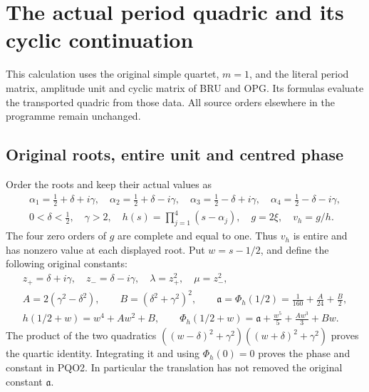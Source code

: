 \documentclass[11pt,a4paper]{article}
\begin{document}


\section{The actual period quadric and its cyclic continuation}
\label{sec:PQO}

This calculation uses the original simple quartet, $m=1$, and the
literal period matrix, amplitude unit and cyclic matrix of BRU and
OPG. Its formulas evaluate the transported quadric from those data.
All source orders elsewhere in the programme remain unchanged.

\subsection{Original roots, entire unit and centred phase}
Order the roots and keep their actual values as
\[
\begin{gathered}
 \alpha_1=\tfrac12+\delta+i\gamma,\quad
 \alpha_2=\tfrac12+\delta-i\gamma,\quad
 \alpha_3=\tfrac12-\delta+i\gamma,\quad
 \alpha_4=\tfrac12-\delta-i\gamma,\\
 0<\delta<\tfrac12,\quad\gamma>2,\quad
 h(s)=\prod_{j=1}^4(s-\alpha_j),\quad g=2\xi,\quad v_h=g/h.
\end{gathered}\tag{PQO1}
\]
The four zero orders of $g$ are complete and equal to one.
Thus $v_h$ is entire and has nonzero value at each displayed root.
Put $w=s-1/2$, and define the following original constants:
\[
\begin{gathered}
 z_+=\delta+i\gamma,\quad z_-=\delta-i\gamma,\quad
 \lambda=z_+^2,\quad\mu=z_-^2,\\
 A=2(\gamma^2-\delta^2),\qquad B=(\delta^2+\gamma^2)^2,\qquad
 \mathfrak a=\Phi_h(1/2)=\frac1{160}+\frac A{24}+\frac B2,\\
 h(1/2+w)=w^4+Aw^2+B,\qquad
 \Phi_h(1/2+w)=\mathfrak a+\frac{w^5}{5}+\frac{Aw^3}{3}+Bw.
\end{gathered}\tag{PQO2}
\]
The product of the two quadratics
$((w-\delta)^2+\gamma^2)((w+\delta)^2+\gamma^2)$ proves the
quartic identity. Integrating it and using $\Phi_h(0)=0$
proves the phase and constant in PQO2. In particular the translation
has not removed the original constant $\mathfrak a$.
\end{document}
